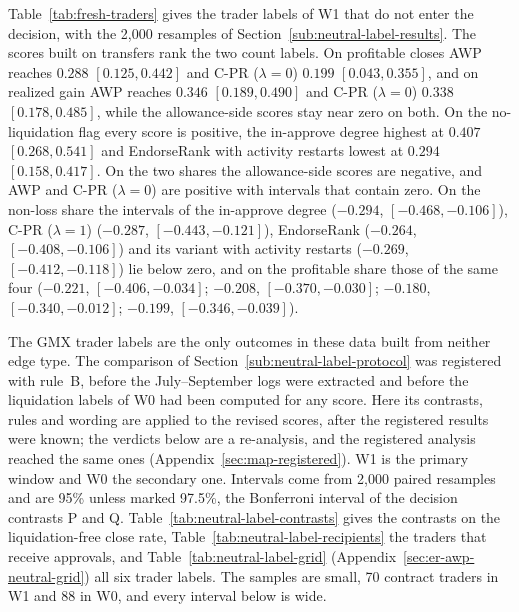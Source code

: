 

Table~\ref{tab:fresh-traders} gives the trader labels of W1 that do not enter the decision, with the 2,000 resamples of Section~\ref{sub:neutral-label-results}. The scores built on transfers rank the two count labels. On profitable closes AWP reaches $0.288$ $[0.125,0.442]$ and C-PR ($\lambda=0$) $0.199$ $[0.043,0.355]$, and on realized gain AWP reaches $0.346$ $[0.189,0.490]$ and C-PR ($\lambda=0$) $0.338$ $[0.178,0.485]$, while the allowance-side scores stay near zero on both. On the no-liquidation flag every score is positive, the in-approve degree highest at $0.407$ $[0.268,0.541]$ and EndorseRank with activity restarts lowest at $0.294$ $[0.158,0.417]$. On the two shares the allowance-side scores are negative, and AWP and C-PR ($\lambda=0$) are positive with intervals that contain zero. On the non-loss share the intervals of the in-approve degree ($-0.294$, $[-0.468,-0.106]$), C-PR ($\lambda=1$) ($-0.287$, $[-0.443,-0.121]$), EndorseRank ($-0.264$, $[-0.408,-0.106]$) and its variant with activity restarts ($-0.269$, $[-0.412,-0.118]$) lie below zero, and on the profitable share those of the same four ($-0.221$, $[-0.406,-0.034]$; $-0.208$, $[-0.370,-0.030]$; $-0.180$, $[-0.340,-0.012]$; $-0.199$, $[-0.346,-0.039]$).




The GMX trader labels are the only outcomes in these data built from neither edge type. The comparison of Section~\ref{sub:neutral-label-protocol} was registered with rule~B, before the July--September logs were extracted and before the liquidation labels of W0 had been computed for any score. Here its contrasts, rules and wording are applied to the revised scores, after the registered results were known; the verdicts below are a re-analysis, and the registered analysis reached the same ones (Appendix~\ref{sec:map-registered}). W1 is the primary window and W0 the secondary one. Intervals come from 2,000 paired resamples and are 95\% unless marked 97.5\%, the Bonferroni interval of the decision contrasts P and Q. Table~\ref{tab:neutral-label-contrasts} gives the contrasts on the liquidation-free close rate, Table~\ref{tab:neutral-label-recipients} the traders that receive approvals, and Table~\ref{tab:neutral-label-grid} (Appendix~\ref{sec:er-awp-neutral-grid}) all six trader labels. The samples are small, 70 contract traders in W1 and 88 in W0, and every interval below is wide.

